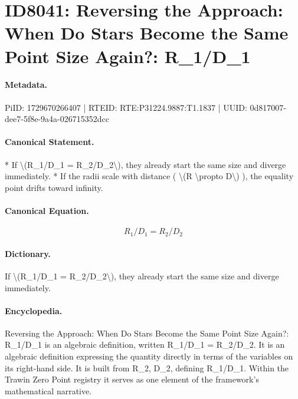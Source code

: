 \section*{ID8041: Reversing the Approach: When Do Stars Become the Same Point Size Again?: R\_1/D\_1}
\paragraph{Metadata.}
PiID: 1729670266407 | RTEID: RTE:P31224.9887:T1.1837 | UUID: 0d817007-dee7-5f8e-9a4a-026715352dcc

\paragraph{Canonical Statement.}
* If \textbackslash{}(R\_1/D\_1 = R\_2/D\_2\textbackslash{}), they already start the same size and diverge immediately. * If the radii scale with distance ( \textbackslash{}(R \textbackslash{}propto D\textbackslash{}) ), the equality point drifts toward infinity.

\paragraph{Canonical Equation.}
\[
R_1/D_1 = R_2/D_2
\]

\paragraph{Dictionary.}
If \textbackslash{}(R\_1/D\_1 = R\_2/D\_2\textbackslash{}), they already start the same size and diverge immediately.

\paragraph{Encyclopedia.}
Reversing the Approach: When Do Stars Become the Same Point Size Again?: R\_1/D\_1 is an algebraic definition, written R\_1/D\_1 = R\_2/D\_2. It is an algebraic definition expressing the quantity directly in terms of the variables on its right-hand side. It is built from R\_2, D\_2, defining R\_1/D\_1. Within the Trawin Zero Point registry it serves as one element of the framework's mathematical narrative.
